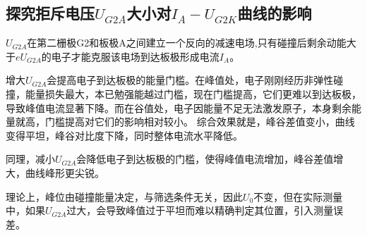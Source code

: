 \documentclass[]{../template/Report}%
\begin{document}
\begin{fullreportonly}
\subsection{探究拒斥电压$U_{G2A}$大小对$I_A-U_{G2K}$曲线的影响}
$U_{G2A}$在第二栅极G2和板极A之间建立一个反向的减速电场,只有碰撞后剩余动能大于$eU_{G2A}$的电子才能克服该电场到达板极形成电流$I_A$。
\par
增大$U_{G2A}$会提高电子到达板极的能量门槛。在峰值处，电子刚刚经历非弹性碰撞，能量损失最大，本已勉强能越过门槛，现在门槛提高，它们更难以到达板极，导致峰值电流显著下降。而在谷值处，电子因能量不足无法激发原子，本身剩余能量就高，门槛提高对它们的影响相对较小。
综合效果就是，峰谷差值变小，曲线变得平坦，峰谷对比度下降，同时整体电流水平降低。
\par
同理，减小$U_{G2A}$会降低电子到达板极的门槛，使得峰值电流增加，峰谷差值增大，曲线峰形更尖锐。
\par
理论上，峰位由碰撞能量决定，与筛选条件无关，因此$U_0$不变，但在实际测量中，如果$U_{G2A}$过大，会导致峰值过于平坦而难以精确判定其位置，引入测量误差。
\end{fullreportonly}
\newpage
\insertnotes
\end{document}
